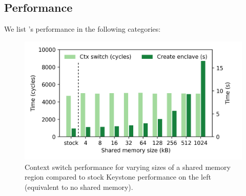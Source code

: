 \subsection{Performance}
\label{sec:eval:numbers}
We list \name{}'s performance in the following categories:



\begin{figure}[t]
    \centering
    \includegraphics[width=\linewidth]{chapters/PIE/images/graphs/ctxswitch.png}
    \caption[Context switch performance]{Context switch performance for varying sizes of a shared memory region compared to stock Keystone performance on the left (equivalent to no shared memory).}
    \label{fig:ctxswitches}
\end{figure}


